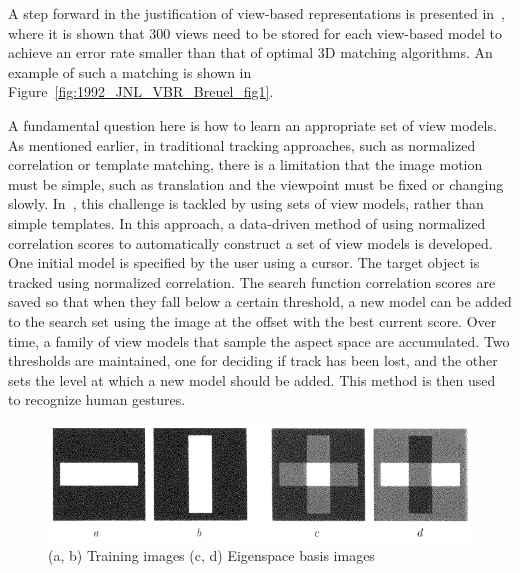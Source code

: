 A step forward in the justification of view-based representations is presented in~\cite{1992_JNL_VBR_Breuel}, where it is shown that 300 views need to be stored for each view-based model to achieve an error rate smaller than that of optimal 3D matching algorithms.  An example of such a matching is shown in Figure~\ref{fig:1992_JNL_VBR_Breuel_fig1}.%

A fundamental question here is how to learn an appropriate set of view models.  As mentioned earlier, in traditional tracking approaches, such as normalized correlation or template matching, there is a limitation that the image motion must be simple, such as translation and the viewpoint must be fixed or changing slowly.  In~\cite{1993_CNF_Gestures_Darrell}, this challenge is tackled by using sets of view models, rather than simple templates.  In this approach, a data-driven method of using normalized correlation scores to automatically construct a set of view models is developed.  One initial model is specified by the user using a cursor.  The target object is tracked using normalized correlation.  The search function correlation scores are saved so that when they fall below a certain threshold, a new model can be added to the search set using the image at the offset with the best current score.  Over time, a family of view models that sample the aspect space are accumulated.  Two thresholds are maintained, one for deciding if track has been lost, and the other sets the level at which a new model should be added.  This method is then used to recognize human gestures.

								\begin{figure}[t]
								\center
								\includegraphics[width=1.0\textwidth]{thesis/TrackingPapers_SubspaceTracking_1998_Black_fig2_nocaption.png}
								\caption{(a, b) Training images (c, d) Eigenspace basis images \cite{1998_JNL_Eigentracking_Black}}
								\end{figure}


